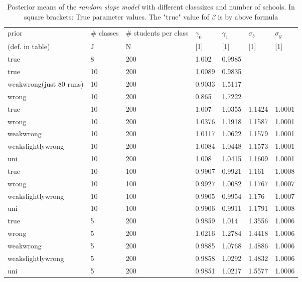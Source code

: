 \begin{table}[!ht]
\begin{center}
\begin{tabular}{l  l  l  l  l  l  l  }
prior & \# classes & \#  students per class & $\gamma_0$ & $\gamma_1$  & $\sigma_b$ & $\sigma_y$ \\
(def. in table)  & J  & N &  [1] &  [1]  & [1] & [1] \\
\hline
true & 8  &  200  &  1.002  &  0.9985 & & \\
true & 10  &  200  &  1.0089  &  0.9835 &  & \\
weakwrong(just 80 runs) & 10  &  200  &  0.9033  &  1.5117 &  & \\
wrong & 10  &  200  &  0.865  &  1.7222 &  & \\
\hline
true & 10  &  200  &  1.007  &  1.0355  &  1.1424  &  1.0001\\
wrong & 10  &  200  &  1.0376  &  1.1918  &  1.1587  &  1.0001\\
weakwrong & 10  &  200  &  1.0117  &  1.0622  &  1.1579  &  1.0001\\
weakslightlywrong & 10  &  200  &  1.0084  &  1.0448  &  1.1573  &  1.0001\\
uni &10  &  200  &  1.008  &  1.0415  &  1.1609  &  1.0001\\
\hline
true &10  &  100  &  0.9907  &  0.9921  &  1.161  &  1.0008\\
wrong &10  &  100  &  0.9927  &  1.0082  &  1.1767  &  1.0007\\
weakslightlywrong & 10  &  100  &  0.9905  &  0.9954  &  1.176  &  1.0007\\
uni & 10  &  100  &  0.9906  &  0.9911  &  1.1791  &  1.0008\\
\hline
true & 5  &  200  &  0.9859  &  1.014  &  1.3556  &  1.0006\\
wrong & 5  &  200  &  1.0216  &  1.2784  &  1.4418  &  1.0006\\
weakwrong & 5  &  200  &  0.9885  &  1.0768  &  1.4886  &  1.0006\\
weakslightlywrong& 5  &  200  &  0.9858  &  1.0292  &  1.4832  &  1.0006\\
uni & 5  &  200  &  0.9851  &  1.0217  &  1.5577  &  1.0006\\
\end{tabular}
\end{center}
\caption{ Posterior means of the \emph{random slope model}  with different classsizes and number of schools. In square brackets: True parameter values. The "true" value fof $\beta$ is by above formula }
\label{tab:relational_table}
\end{table}




